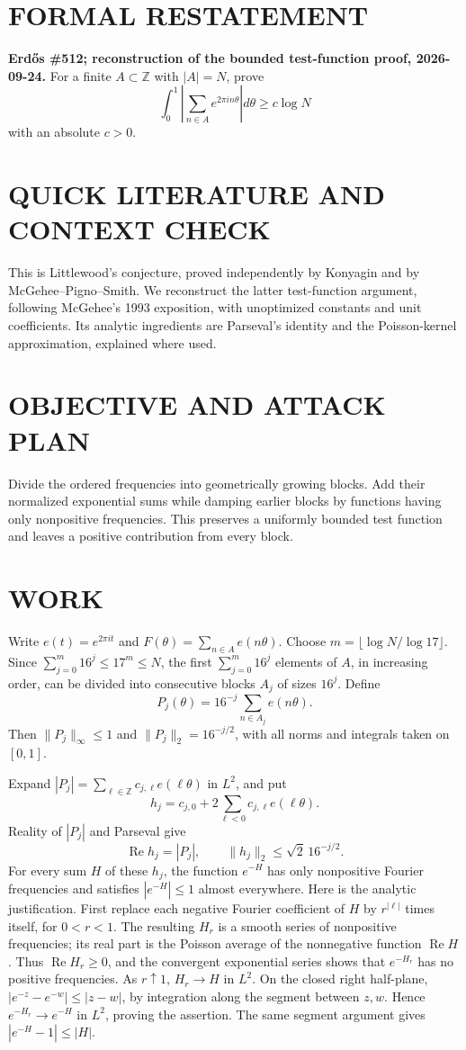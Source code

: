 \section{FORMAL RESTATEMENT}
\textbf{Erd\H{o}s \#512; reconstruction of the bounded test-function proof, 2026-09-24.}
For a finite $A\subset\mathbb Z$ with $|A|=N$, prove
\[
 \int_0^1\left|\sum_{n\in A}e^{2\pi in\theta}\right|d\theta\geq c\log N
\]
with an absolute $c>0$.

\section{QUICK LITERATURE AND CONTEXT CHECK}
This is Littlewood's conjecture, proved independently by Konyagin and by McGehee--Pigno--Smith. We reconstruct the latter test-function argument, following McGehee's 1993 exposition, with unoptimized constants and unit coefficients. Its analytic ingredients are Parseval's identity and the Poisson-kernel approximation, explained where used.

\section{OBJECTIVE AND ATTACK PLAN}
Divide the ordered frequencies into geometrically growing blocks. Add their normalized exponential sums while damping earlier blocks by functions having only nonpositive frequencies. This preserves a uniformly bounded test function and leaves a positive contribution from every block.

\section{WORK}
Write $e(t)=e^{2\pi it}$ and $F(\theta)=\sum_{n\in A}e(n\theta)$. Choose $m=\lfloor\log N/\log17\rfloor$. Since $\sum_{j=0}^m16^j\leq17^m\leq N$, the first $\sum_{j=0}^m16^j$ elements of $A$, in increasing order, can be divided into consecutive blocks $A_j$ of sizes $16^j$. Define
\[
 P_j(\theta)=16^{-j}\sum_{n\in A_j}e(n\theta).
\]
Then $\|P_j\|_\infty\leq1$ and $\|P_j\|_2=16^{-j/2}$, with all norms and integrals taken on $[0,1]$.

Expand $|P_j|=\sum_{\ell\in\mathbb Z}c_{j,\ell}e(\ell\theta)$ in $L^2$, and put
\[
 h_j=c_{j,0}+2\sum_{\ell<0}c_{j,\ell}e(\ell\theta).
\]
Reality of $|P_j|$ and Parseval give
\[
 \operatorname{Re}h_j=|P_j|,\qquad
 \|h_j\|_2\leq\sqrt2\,16^{-j/2}.                    \tag{1}
\]
For every sum $H$ of these $h_j$, the function $e^{-H}$ has only nonpositive Fourier frequencies and satisfies $|e^{-H}|\leq1$ almost everywhere. Here is the analytic justification. First replace each negative Fourier coefficient of $H$ by $r^{|\ell|}$ times itself, for $0<r<1$. The resulting $H_r$ is a smooth series of nonpositive frequencies; its real part is the Poisson average of the nonnegative function $\operatorname{Re}H$. Thus $\operatorname{Re}H_r\geq0$, and the convergent exponential series shows that $e^{-H_r}$ has no positive frequencies. As $r\uparrow1$, $H_r\to H$ in $L^2$. On the closed right half-plane,
$|e^{-z}-e^{-w}|\leq|z-w|$, by integration along the segment between $z,w$. Hence $e^{-H_r}\to e^{-H}$ in $L^2$, proving the assertion. The same segment argument gives $|e^{-H}-1|\leq|H|$.

